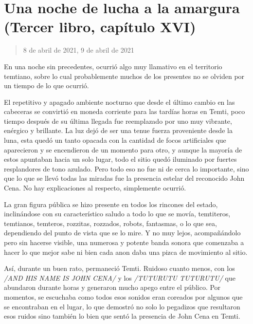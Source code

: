 \documentclass[
  spanish,
]{book}
\begin{document}
\hypertarget{una-noche-de-lucha-a-la-amargura-tercer-libro-capuxedtulo-xvi}{%
\section{Una noche de lucha a la amargura (Tercer libro, capítulo XVI)}\label{una-noche-de-lucha-a-la-amargura-tercer-libro-capuxedtulo-xvi}}

\begin{quote}
8 de abril de 2021, 9 de abril de 2021
\end{quote}

En una noche sin precedentes, ocurrió algo muy llamativo en el territorio temtiano, sobre lo cual probablemente muchos de los presentes no se olviden por un tiempo de lo que ocurrió.

El repetitivo y apagado ambiente nocturno que desde el último cambio en las cabeceras se convirtió en moneda corriente para las tardías horas en Temti, poco tiempo después de su última llegada fue reemplazado por uno muy vibrante, enérgico y brillante. La luz dejó de ser una tenue fuerza proveniente desde la luna, esta quedó un tanto opacada con la cantidad de focos artificiales que aparecieron y se encendieron de un momento para otro, y aunque la mayoría de estos apuntaban hacia un solo lugar, todo el sitio quedó iluminado por fuertes resplandores de tono azulado. Pero todo eso no fue ni de cerca lo importante, sino que lo que se llevó todas las miradas fue la presencia estelar del reconocido John Cena. No hay explicaciones al respecto, simplemente ocurrió.

La gran figura pública se hizo presente en todos los rincones del estado, inclinándose con su característico saludo a todo lo que se movía, temtiteros, temtianos, temteros, rozzitas, rozzados, robots, fantasmas, o lo que sea, dependiendo del punto de vista que se lo mire. Y no muy lejos, acompañándolo pero sin hacerse visible, una numerosa y potente banda sonora que comenzaba a hacer lo que mejor sabe ni bien cada anon daba una pizca de movimiento al sitio.

Así, durante un buen rato, permaneció Temti. Ruidoso cuanto menos, con los \emph{/AND HIS NAME IS JOHN CENA/} y los \emph{/TUTURUTU TUTURUTU/} que abundaron durante horas y generaron mucho apego entre el público. Por momentos, se escuchaba como todos esos sonidos eran coreados por algunos que se encontraban en el lugar, lo que demostró no solo lo pegadizos que resultaron esos ruidos sino también lo bien que sentó la presencia de John Cena en Temti.
\end{document}
